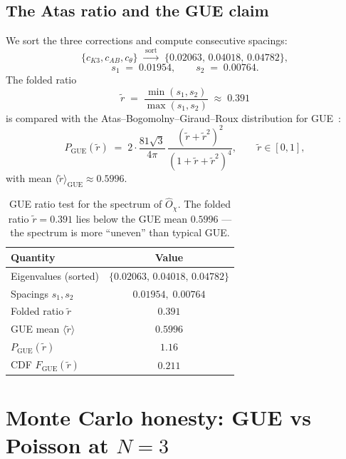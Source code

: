 \documentclass[11pt,a4paper]{article}
\newcommand{\Opchi}{\hat{O}_\chi}
\theoremstyle{plain}
\theoremstyle{definition}
\theoremstyle{remark}
\begin{document}
\subsection{The Atas ratio and the GUE claim}

We sort the three corrections and compute consecutive spacings:
\[
  \{c_{K3}, c_{AB}, c_\theta\}
  \;\xrightarrow{\;\text{sort}\;}\;
  \{0.02063,\, 0.04018,\, 0.04782\},
\]
\[
  s_1 \;=\; 0.01954, \qquad
  s_2 \;=\; 0.00764.
\]
The folded ratio
\begin{equation}
  \tilde r \;=\; \frac{\min(s_1, s_2)}{\max(s_1, s_2)}
            \;\approx\; 0.391
\end{equation}
is compared with the Atas--Bogomolny--Giraud--Roux distribution for
GUE~\cite{atas2012gue,mehta2004rm}:
\begin{equation}\label{eq:atas}
  P_{\mathrm{GUE}}(\tilde r)
  \;=\; 2\cdot\frac{81\sqrt 3}{4\pi}\,
        \frac{(\tilde r + \tilde r^2)^2}
             {(1 + \tilde r + \tilde r^2)^4},
        \qquad \tilde r \in [0, 1],
\end{equation}
with mean $\langle\tilde r\rangle_{\mathrm{GUE}} \approx 0.5996$.

\begin{table}[h]
\centering
\small
\begin{tabular}{l c}
\toprule
Quantity & Value \\
\midrule
Eigenvalues (sorted)        & $\{0.02063,\, 0.04018,\, 0.04782\}$ \\
Spacings $s_1, s_2$         & $0.01954,\; 0.00764$ \\
Folded ratio $\tilde r$     & $0.391$ \\
GUE mean $\langle\tilde r\rangle$ & $0.5996$ \\
$P_{\mathrm{GUE}}(\tilde r)$     & $1.16$ \\
CDF $F_{\mathrm{GUE}}(\tilde r)$ & $0.211$ \\
\bottomrule
\end{tabular}
\caption{GUE ratio test for the spectrum of $\Opchi$.  The folded
ratio $\tilde r = 0.391$ lies below the GUE mean $0.5996$ --- the
spectrum is more ``uneven'' than typical GUE.}
\label{tab:gue-test}
\end{table}

\section{Monte Carlo honesty: GUE vs Poisson at $N=3$}
\label{sec:monte-carlo}
\end{document}
